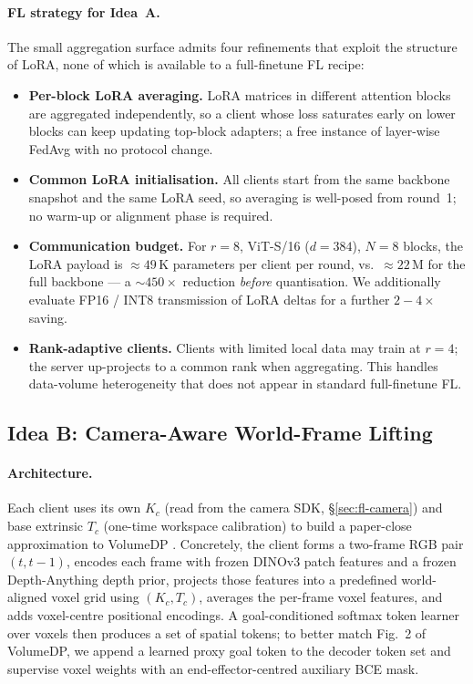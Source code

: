 \documentclass{article}
\begin{document}
\paragraph{FL strategy for Idea~A.}
The small aggregation surface admits four refinements that exploit
the structure of LoRA, none of which is available to a
full-finetune FL recipe:
\begin{itemize}\setlength{\itemsep}{1pt}
\item \textbf{Per-block LoRA averaging.} LoRA matrices in
different attention blocks are aggregated independently, so a
client whose loss saturates early on lower blocks can keep
updating top-block adapters; a free instance of layer-wise
FedAvg with no protocol change.
\item \textbf{Common LoRA initialisation.} All clients start from
the same backbone snapshot and the same LoRA seed, so averaging
is well-posed from round~1; no warm-up or alignment phase is
required.
\item \textbf{Communication budget.} For $r\!=\!8$, ViT-S/16
($d\!=\!384$), $N\!=\!8$ blocks, the LoRA payload is
$\approx\!49$\,K parameters per client per round, vs.\
$\approx\!22$\,M for the full backbone --- a $\sim\!450\!\times$
reduction \emph{before} quantisation. We additionally evaluate
FP16 / INT8 transmission of LoRA deltas for a further
$2\!-\!4\!\times$ saving.
\item \textbf{Rank-adaptive clients.} Clients with limited local
data may train at $r\!=\!4$; the server up-projects to a common
rank when aggregating. This handles data-volume heterogeneity
that does not appear in standard full-finetune FL.
\end{itemize}

\subsection{Idea B: Camera-Aware World-Frame Lifting}
\label{sec:idea-b}

\paragraph{Architecture.}
Each client uses its own $K_c$ (read from the camera SDK,
\S\ref{sec:fl-camera}) and base extrinsic $T_c$ (one-time
workspace calibration) to build a paper-close approximation to
VolumeDP \cite{volumedp2026}. Concretely, the client forms a
two-frame RGB pair $(t,t\!-\!1)$, encodes each frame with frozen
DINOv3 patch features and a frozen Depth-Anything depth prior,
projects those features into a predefined world-aligned voxel grid
using $(K_c, T_c)$, averages the per-frame voxel features, and
adds voxel-centre positional encodings. A goal-conditioned softmax
token learner over voxels then produces a set of spatial tokens;
to better match Fig.~2 of VolumeDP, we append a learned proxy
goal token to the decoder token set and supervise voxel weights
with an end-effector-centred auxiliary BCE mask.
\end{document}
